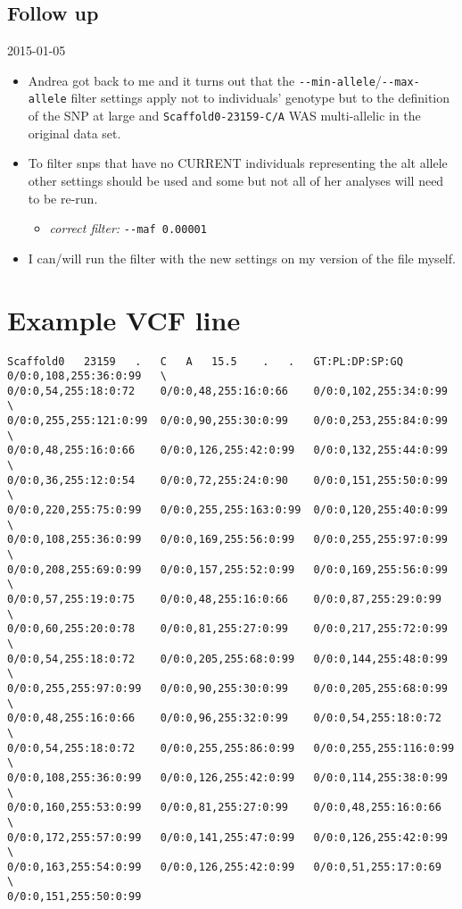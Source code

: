 \documentclass[letterpaper]{scrartcl}
\begin{document}
\subsection{Follow up}\label{follow-up}

2015-01-05

\begin{itemize}
\itemsep1pt\parskip0pt
\item
  Andrea got back to me and it turns out that the
  \texttt{-\/-min-allele}/\texttt{-\/-max-allele} filter settings apply
  not to individuals' genotype but to the definition of the SNP at large
  and \texttt{Scaffold0-23159-C/A} WAS multi-allelic in the original
  data set.
\item
  To filter snps that have no CURRENT individuals representing the alt
  allele other settings should be used and some but not all of her
  analyses will need to be re-run.

  \begin{itemize}
  \itemsep1pt\parskip0pt
  \item
    \emph{correct filter:} \texttt{-\/-maf 0.00001}
  \end{itemize}
\item
  I can/will run the filter with the new settings on my version of the
  file myself.
\end{itemize}

\section{Example VCF line}\label{example-vcf-line}

\begin{verbatim}
Scaffold0   23159   .   C   A   15.5    .   .   GT:PL:DP:SP:GQ  0/0:0,108,255:36:0:99   \
0/0:0,54,255:18:0:72    0/0:0,48,255:16:0:66    0/0:0,102,255:34:0:99   \
0/0:0,255,255:121:0:99  0/0:0,90,255:30:0:99    0/0:0,253,255:84:0:99   \
0/0:0,48,255:16:0:66    0/0:0,126,255:42:0:99   0/0:0,132,255:44:0:99   \
0/0:0,36,255:12:0:54    0/0:0,72,255:24:0:90    0/0:0,151,255:50:0:99   \
0/0:0,220,255:75:0:99   0/0:0,255,255:163:0:99  0/0:0,120,255:40:0:99   \
0/0:0,108,255:36:0:99   0/0:0,169,255:56:0:99   0/0:0,255,255:97:0:99   \
0/0:0,208,255:69:0:99   0/0:0,157,255:52:0:99   0/0:0,169,255:56:0:99   \
0/0:0,57,255:19:0:75    0/0:0,48,255:16:0:66    0/0:0,87,255:29:0:99    \
0/0:0,60,255:20:0:78    0/0:0,81,255:27:0:99    0/0:0,217,255:72:0:99   \
0/0:0,54,255:18:0:72    0/0:0,205,255:68:0:99   0/0:0,144,255:48:0:99   \
0/0:0,255,255:97:0:99   0/0:0,90,255:30:0:99    0/0:0,205,255:68:0:99   \
0/0:0,48,255:16:0:66    0/0:0,96,255:32:0:99    0/0:0,54,255:18:0:72    \
0/0:0,54,255:18:0:72    0/0:0,255,255:86:0:99   0/0:0,255,255:116:0:99  \
0/0:0,108,255:36:0:99   0/0:0,126,255:42:0:99   0/0:0,114,255:38:0:99   \
0/0:0,160,255:53:0:99   0/0:0,81,255:27:0:99    0/0:0,48,255:16:0:66    \
0/0:0,172,255:57:0:99   0/0:0,141,255:47:0:99   0/0:0,126,255:42:0:99   \
0/0:0,163,255:54:0:99   0/0:0,126,255:42:0:99   0/0:0,51,255:17:0:69    \
0/0:0,151,255:50:0:99
\end{verbatim}
\end{document}
